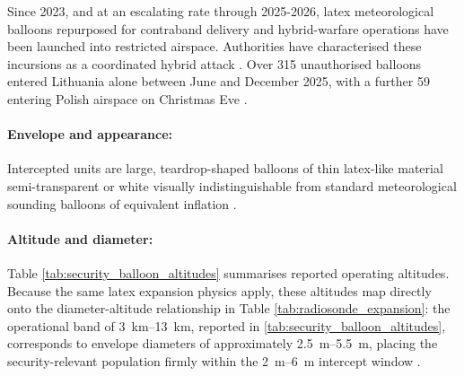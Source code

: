 Since 2023, and at an escalating rate through 2025-2026, latex meteorological balloons repurposed for contraband delivery and hybrid-warfare operations have been launched into restricted airspace. Authorities have characterised these incursions as
a coordinated hybrid attack \cite{CNN2025BalloonSays, AlJazeera2025LithuaniaBelarus, RFE/RLBelarusService2025UpBoth}. Over 315 unauthorised balloons entered Lithuania alone between June and December 2025, with a further 59 entering Polish airspace on Christmas Eve \cite{EuromaidanPress2025PolandEve, RFE/RLBelarusService2025UpBoth}.
\vspace{-10pt}

\paragraph{Envelope and appearance:}
Intercepted units are large, teardrop-shaped balloons of thin latex-like material semi-transparent or white visually indistinguishable from standard meteorological sounding balloons of equivalent inflation \cite{WTAQ2025Factbox:Lithuania}.
\vspace{-10pt}

\paragraph{Altitude and diameter:}
Table \ref{tab:security_balloon_altitudes} summarises reported operating altitudes. Because the same latex expansion physics apply, these altitudes map directly onto the diameter-altitude relationship in Table \ref{tab:radiosonde_expansion}: the operational band of \SIrange{3}{13}{\kilo\metre}, reported in \autoref{tab:security_balloon_altitudes}, corresponds to envelope diameters of approximately \SIrange{2.5}{5.5}{\metre}, placing the security-relevant population firmly within the \SIrange{2}{6}{\metre} intercept window \cite{WorldMeteorologicalOrganization2018GuideGuide}.
 
